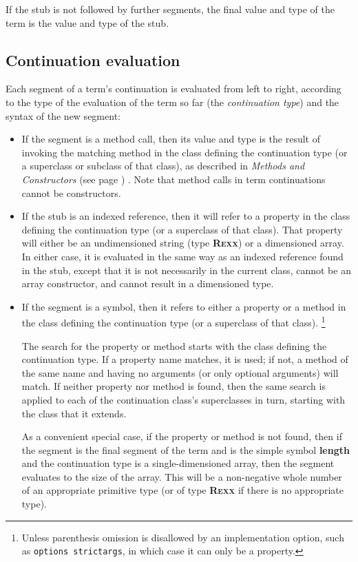 If the stub is not followed by further segments, the final value and
type of the term is the value and type of the stub.
\subsection{Continuation evaluation}
 
Each segment of a term's continuation is evaluated from left to right,
according to the type of the evaluation of the term so far (the
\emph{continuation type}) and the syntax of the new segment:
\begin{itemize}
\item 
If the segment is a method call, then its value and type is the result
of invoking the matching method in the class defining the continuation
type (or a superclass or subclass of that class), as described in
 \emph{Methods and Constructors} (see page \pageref{refmethcon}) .
Note that method calls in term continuations cannot be constructors.
\item 
If the stub is an indexed reference, then it will refer to a property
in the class defining the continuation type (or a superclass of that
class).
That property will either be an undimensioned \nr{} string
(type \textbf{R\textsc{exx}}) or a dimensioned array.  In either case, it is
evaluated in the same way as an indexed reference found in the stub,
except that it is not necessarily in the current class, cannot
be an array constructor, and cannot result in a dimensioned type.
\item 
If the segment is a symbol, then it refers to either a property
or a method in the class defining the continuation type (or a superclass
of that class).
\footnote{
Unless parenthesis omission is disallowed by an implementation option,
such as \texttt{options strictargs}, in which case it can only be a
property.
}
 
The search for the property or method starts with the class defining the
continuation type.  If a property name matches, it is used; if not, a
method of the same name and having no arguments (or only optional
arguments) will match.
If neither property nor method is found, then the same search is applied
to each of the continuation class's superclasses in turn, starting with
the class that it extends.
 
As a convenient special case, if the property or method is not found,
then if the segment is the final segment of the term and is the simple
symbol \textbf{length} and the continuation type is a
single-dimensioned array, then the segment evaluates to the size of the
array.
This will be a non-negative whole number of an appropriate primitive
type (or of type \textbf{R\textsc{exx}} if there is no appropriate
type).
\end{itemize}
 
